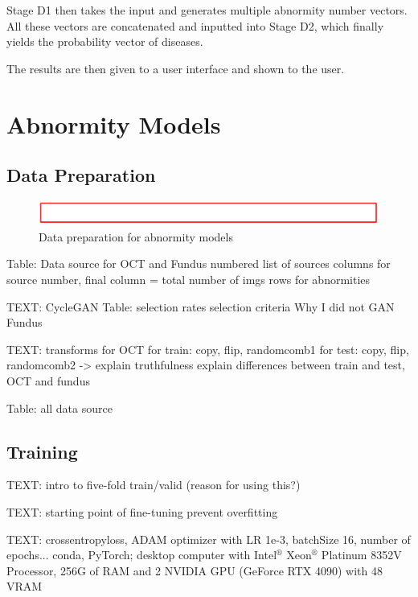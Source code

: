 \documentclass{article}
\begin{document}
		Stage D1 then takes the input and generates multiple abnormity number vectors. All these vectors are concatenated and inputted into Stage D2, which finally yields the probability vector of diseases.
		
		The results are then given to a user interface and shown to the user.
		
		
	\section{Abnormity Models}
	
		\subsection{Data Preparation}
			
			\begin{figure}[htbp]
				\centering
				\includegraphics[width=\linewidth]{Figs/Temp.png}
				\caption{Data preparation for abnormity models}
				\vspace{0.3cm}
				\label{fig:A_data_prep}
			\end{figure}
			
			Table: Data source for OCT and Fundus
				numbered list of sources
				columns for source number, final column = total number of imgs
				rows for abnormities
			
			TEXT: CycleGAN
				Table: selection rates
				selection criteria
				Why I did not GAN Fundus
				
			TEXT: transforms for OCT
				for train: copy, flip, randomcomb1
				for test: copy, flip, randomcomb2 -> explain truthfulness
				explain differences between train and test, OCT and fundus

			Table: all data source
			
		\subsection{Training}
			
			TEXT: intro to five-fold train/valid (reason for using this?)
			
			TEXT: starting point of fine-tuning
			prevent overfitting
			
			TEXT: crossentropyloss, ADAM optimizer with LR 1e-3, batchSize 16, number of epochs...
			conda, PyTorch;
			desktop computer with Intel$^®$ Xeon$^®$ Platinum 8352V Processor, 256G of RAM and 2 NVIDIA GPU (GeForce RTX 4090) with 48 VRAM
			
\end{document}
